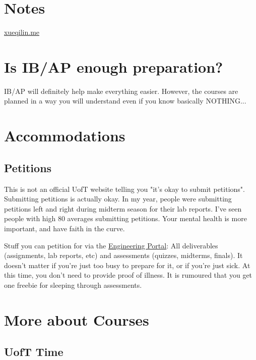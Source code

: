 \section{Notes}

\url{xueqilin.me}
\section{Is IB/AP enough preparation?}

IB/AP will definitely help make everything easier. However, the courses are planned in a way you will understand even if you know basically NOTHING...

\section{Accommodations}

\subsection{Petitions}

This is not an official UofT website telling you "it's okay to submit petitions". Submitting petitions is actually okay. In my year, people were submitting petitions left and right during midterm season for their lab reports. I've seen people with high 80 averages submitting petitions. Your mental health is more important, and have faith in the curve.

Stuff you can petition for via the \href{https://www.google.com/url?sa=t&rct=j&q=&esrc=s&source=web&cd=&cad=rja&uact=8&ved=2ahUKEwjZj-qeh-7-AhX-kokEHX8-C8YQFnoECA0QAQ&url=http\%3A\%2F\%2Fundergrad.engineering.utoronto.ca\%2Fskule-\%2520\%2520\%2520\%2520\%2520\%2520\%2520\%2520\%2520\%2520\%2520\%2520life\%2Fthe-engineering-portal\%2F&usg=AOvVaw145xL8tAHUKBRq6D6rbDhS}{Engineering Portal}: All deliverables (assignments, lab reports, etc) and assessments (quizzes, midterms, finals). It doesn't matter if you're just too busy to prepare for it, or if you're just sick. At this time, you don't need to provide proof of illness. It is rumoured that you get one freebie for sleeping through assessments.

\section{More about Courses}

\subsection{UofT Time}

